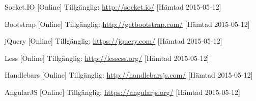 \vspace{-15mm}
\renewcommand{\refname}{}
\begin{thebibliography}{9}

Socket.IO [Online] Tillgänglig: 
\url{http://socket.io/} [Hämtad 2015-05-12]

Bootstrap [Online] Tillgänglig: 
\url{http://getbootstrap.com/} [Hämtad 2015-05-12]

jQuery [Online] Tillgänglig: 
\url{https://jquery.com/} [Hämtad 2015-05-12]

Less [Online] Tillgänglig: 
\url{http://lesscss.org/} [Hämtad 2015-05-12]

Handlebars [Online] Tillgänglig: 
\url{http://handlebarsjs.com/} [Hämtad 2015-05-12]

AngularJS [Online] Tillgänglig: 
\url{https://angularjs.org/} [Hämtad 2015-05-12]

\end{thebibliography}
